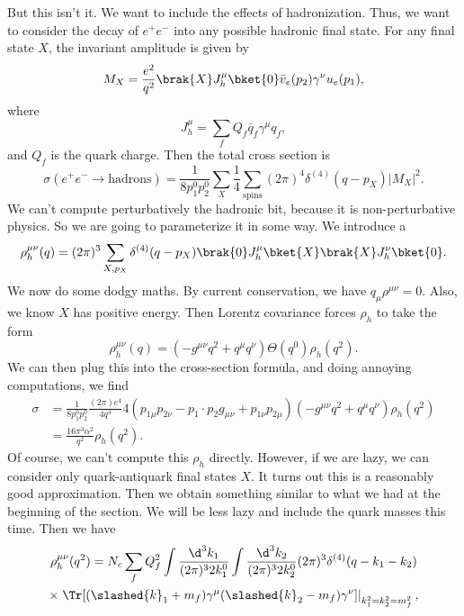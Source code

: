 \documentclass[a4paper]{article}
\begin{document}
But this isn't it. We want to include the effects of hadronization. Thus, we want to consider the decay of $e^+ e^-$ into any possible hadronic final state. For any final state $X$, the invariant amplitude is given by
\[
  M_X = \frac{e^2}{q^2} \brak{X} J^\mu_h \bket{0} \bar{v}_e (p_2) \gamma^\nu u_e(p_1),
\]
where
\[
  J^\mu_h = \sum_f Q_f \bar{q}_f \gamma^\mu q_f,
\]
and $Q_f$ is the quark charge. Then the total cross section is
\[
  \sigma(e^+ e^- \to \mathrm{hadrons}) = \frac{1}{8p_1^0 p_2^0} \sum_{X} \frac{1}{4} \sum_{\mathrm{spins}} (2\pi)^4 \delta^{(4)} (q - p_X) |M_X|^2.
\]
We can't compute perturbatively the hadronic bit, because it is non-perturbative physics. So we are going to parameterize it in some way. We introduce a 
\[
  \rho_h^{\mu\nu} (q) = (2\pi)^3 \sum_{X, p_X} \delta^{(4)} (q - p_X) \brak{0}J_h^\mu\bket{X} \brak{X}J_h^\nu\bket{0}.
\]
We now do some dodgy maths. By current conservation, we have $q_\mu \rho^{\mu\nu} = 0$. Also, we know $X$ has positive energy. Then Lorentz covariance forces $\rho_h$ to take the form
\[
  \rho_h^{\mu\nu}(q) = (- g^{\mu\nu} q^2 + q^\mu q^\nu) \Theta(q^0) \rho_h (q^2).
\]
We can then plug this into the cross-section formula, and doing annoying computations, we find
\begin{align*}
  \sigma &= \frac{1}{8 p_1^0 p_2^0} \frac{(2\pi) e^4}{4 q^4} 4 (p_{1\mu} p_{2\nu} - p_1 \cdot p_2 g_{\mu\nu} + p_{1\nu} p_{2\mu})(-g^{\mu\nu} q^2 + q^\mu q^\nu) \rho_h(q^2)\\
  &= \frac{16 \pi^3 \alpha^2}{q^2} \rho_h(q^2).
\end{align*}
Of course, we can't compute this $\rho_h$ directly. However, if we are lazy, we can consider only quark-antiquark final states $X$. It turns out this is a reasonably good approximation. Then we obtain something similar to what we had at the beginning of the section. We will be less lazy and include the quark masses this time. Then we have
%
%
\begin{multline*}
  \rho_h^{\mu\nu}(q^2) = N_c \sum_f Q_f^2 \int \frac{\d^3 k_1}{(2\pi)^3 2 k_1^0} \int \frac{\d^3 k_2}{(2\pi)^3 2k_2^0} (2\pi)^3 \delta^{(4)}(q - k_1 - k_2)\\
  \times \left.\Tr [(\slashed{k}_1 + m_f) \gamma^\mu (\slashed{k}_2 - m_f) \gamma^{\nu}]\right|_{k_1^2 = k_2^2 = m_f^2}, %
\end{multline*}
\end{document}

